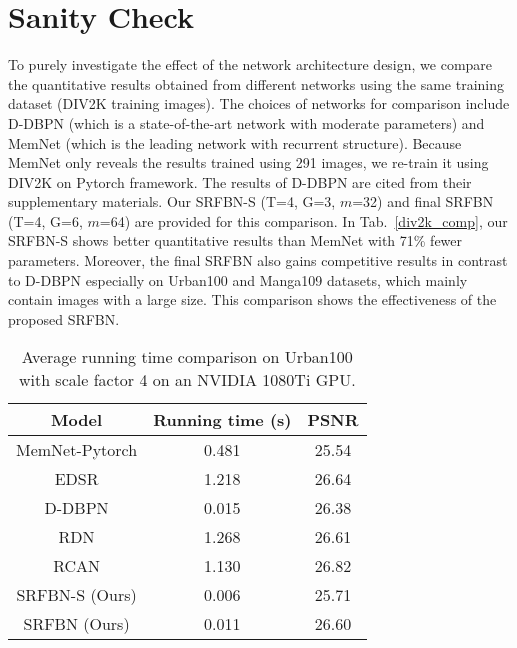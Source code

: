 \documentclass[10pt,twocolumn,letterpaper]{article}
\begin{document}
\section{Sanity Check}
To purely investigate the effect of the network architecture design, we compare the quantitative results obtained from different networks using the same training dataset (DIV2K training images\cite{Agustsson_2017_CVPR_Workshops}). The choices of networks for comparison include D-DBPN (which is a state-of-the-art network with moderate parameters) and MemNet\cite{tai2017memnet} (which is the leading network with recurrent structure). Because MemNet only reveals the results trained using 291 images, we re-train it using DIV2K on Pytorch framework. The results of D-DBPN are cited from their supplementary materials. Our SRFBN-S (T=4, G=3, $m$=32) and final SRFBN (T=4, G=6, $m$=64) are provided for this comparison. In Tab.~\ref{div2k_comp}, our SRFBN-S shows better quantitative results than MemNet with 71\% fewer parameters. Moreover, the final SRFBN also gains competitive results in contrast to D-DBPN especially on Urban100 and Manga109 datasets, which mainly contain images with a large size. This comparison shows the effectiveness of the proposed SRFBN.

\begin{table}[htbp]
	\centering
	\begin{tabular}{|c|c|c|}
		\hline
		Model          & Running time (s) & PSNR  \\ \hline \hline
		MemNet-Pytorch & 0.481            & 25.54 \\ \hline
		EDSR           & 1.218            & 26.64 \\ \hline
		D-DBPN         & 0.015            & 26.38 \\ \hline
		RDN            & 1.268            & 26.61 \\ \hline
		RCAN           & 1.130            & 26.82 \\ \hline
		SRFBN-S (Ours) & 0.006            & 25.71 \\ \hline
		SRFBN (Ours)   & 0.011            & 26.60 \\ \hline
	\end{tabular}
	\medskip
	\caption{Average running time comparison on Urban100 with scale factor 4 on an NVIDIA 1080Ti GPU.}
	\label{runtime}
\end{table}
\end{document}
